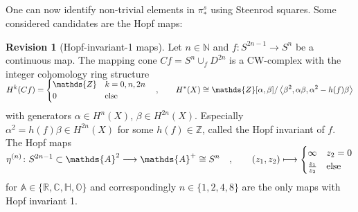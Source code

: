 \documentclass[english]{scrartcl}
\theoremstyle{definition}
\newtheorem*{Rev}{Revision}
\theoremstyle{remark}
\newcommand*{\N}{\mathds{N}}
\newcommand*{\Z}{\mathds{Z}}
\newcommand*{\R}{\mathds{R}}
\newcommand*{\C}{\mathds{C}}
\newcommand*{\Quaternions}{\mathds{H}}
\newcommand*{\Octonions}{\mathds{O}}
\newcommand*{\A}{\mathds{A}}
\newcommand*{\longto}{\longrightarrow}
\newcommand*{\Sph}[1]{\ensuremath{S^{#1}}} %
\begin{document}
One can now identify non-trivial elements in $\pi_*^s$ using Steenrod
squares. Some considered candidates are the Hopf maps:
\begin{Rev}[Hopf-invariant-1 maps]
  Let $n\in\N$ and $f\colon \Sph{2n-1}\to\Sph{n}$ be a continuous map. The
  mapping cone $Cf=S^{n}\cup_f D^{2n}$ is a CW-complex with the integer
  cohomology ring structure
  \begin{gather*}
    \SwapAboveDisplaySkip
    H^k(Cf) =
    \begin{cases}
      \Z & k=0,n,2n\\
      0 & \text{else}
    \end{cases}
    \quad,\qquad
    H^*(X) \cong \Z[\alpha,\beta]/
    \left\langle \beta^2,\alpha\beta,\alpha^2-h(f)\beta\right\rangle
  \end{gather*}
  with generators $\alpha\in H^n(X)$, $\beta\in H^{2n}(X)$.
  Especially $\alpha^2 = h(f)\beta\in H^{2n}(X)$ for some $h(f)\in\Z$,
  called the Hopf invariant of $f$.
  The Hopf maps
  \begin{gather*}
    \SwapAboveDisplaySkip
    \eta^{(n)}\colon
    \Sph{2n-1}\subset\A^2\longto\A^+\cong\Sph{n}
    \quad,\qquad
    (z_1,z_2)\longmapsto
      \begin{cases}
        \infty & z_2=0\\
        \frac{z_1}{z_2} & \text{else}
      \end{cases}
  \end{gather*}
  for $\A\in\{\R,\C,\Quaternions,\Octonions\}$
  and correspondingly $n\in\{1,2,4,8\}$ are
  the only maps with Hopf invariant 1.
\end{Rev}
\end{document}
